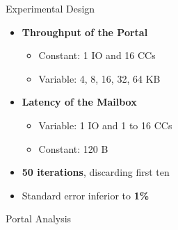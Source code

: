 	\begin{frame}[fragile]{Experimental Design}
		\begin{itemize}
			\item \textbf{Throughput of the Portal}
			\begin{itemize}
				\item Constant: 1 IO and 16 CCs
				\item Variable: 4, 8, 16, 32, 64 KB
			\end{itemize}
		\end{itemize}

		\begin{itemize}
			\item \textbf{Latency of the Mailbox}
			\begin{itemize}
				\item Variable: 1 IO and 1 to 16 CCs
				\item Constant: 120 B
			\end{itemize}
		\end{itemize}

		\begin{itemize}
			\item \textbf{50 iterations}, discarding first ten
			\item Standard error inferior to \textbf{1\%}
		\end{itemize}

	\end{frame}

	\begin{frame}[fragile]{Portal Analysis}

	\end{frame}

